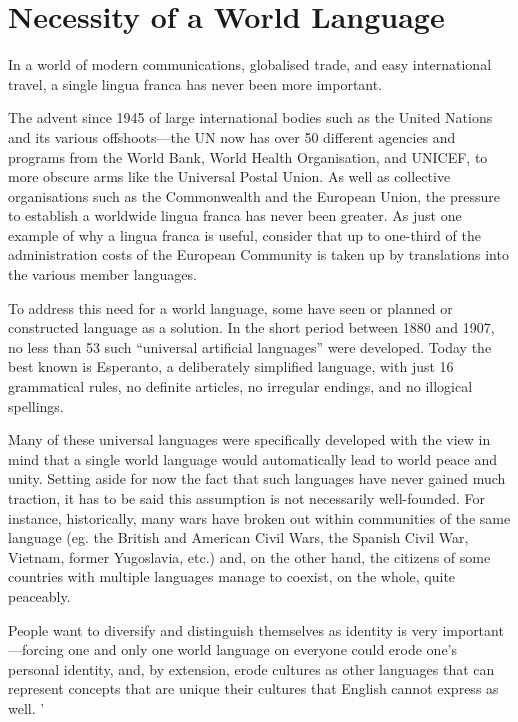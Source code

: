 \documentclass[../main.tex]{subfiles}
\begin{document}
    \section{Necessity of a World Language}
        In a world of modern communications, globalised trade, and easy international travel, a single lingua franca has never been more important. \par 
        The advent since 1945 of large international bodies such as the United Nations and its various offshoots---the UN now has over 50 different agencies and programs from the World Bank, World Health Organisation, and UNICEF, to more obscure arms like the Universal Postal Union. As well as collective organisations such as the Commonwealth and the European Union, the pressure to establish a worldwide lingua franca has never been greater. As just one example of why a lingua franca is useful, consider that up to one-third of the administration costs of the European Community is taken up by translations into the various member languages. \par 
        To address this need for a world language, some have seen or planned or constructed language as a solution. In the short period between 1880 and 1907, no less than 53 such ``universal artificial languages'' were developed. Today the best known is Esperanto, a deliberately simplified language, with just 16 grammatical rules, no definite articles, no irregular endings, and no illogical spellings. \par
        Many of these universal languages were specifically developed with the view in mind that a single world language would automatically lead to world peace and unity. Setting aside for now the fact that such languages have never gained much traction, it has to be said this assumption is not necessarily well-founded. For instance, historically, many wars have broken out within communities of the same language (eg. the British and American Civil Wars, the Spanish Civil War, Vietnam, former Yugoslavia, etc.) and, on the other hand, the citizens of some countries with multiple languages manage to coexist, on the whole, quite peaceably. \par 
        People want to diversify and distinguish themselves as identity is very important---forcing one and only one world language on everyone could erode one's personal identity, and, by extension, erode cultures as other languages that can represent concepts that are unique their cultures that English cannot express as well. '
\end{document}
